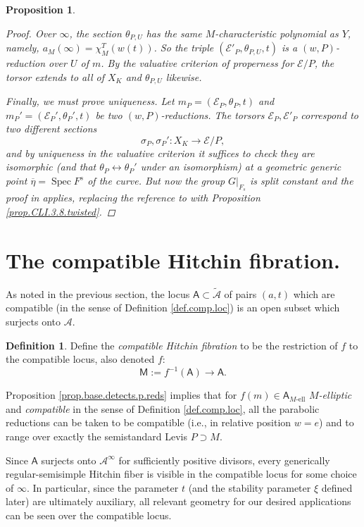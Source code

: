 \documentclass[openany]{amsbook}
\newtheorem{proposition}[theorem]{Proposition}
\theoremstyle{definition}
\newtheorem{definition}[theorem]{Definition}
\theoremstyle{remark}
\numberwithin{equation}{section}
\newcommand{\cA}{\mathcal{A}}
\newcommand{\cE}{\mathcal{E}}
\newcommand{\ol}[1]{\overline{#1}}
\renewcommand{\-}{\operatorname{-}}
\newcommand{\Spec}{\operatorname{Spec}}
\newcommand{\el}{\text{-ell}}
\newcommand{\ctA}{\widetilde{\cA}}
\newcommand{\bM}{\mathsf{M}}
\newcommand{\bA}{\mathsf{A}}
\newcommand{\bAe}[1]{\bA_{#1\el}}
\begin{document}
\begin{proposition}
\begin{proof}
        Over $\infty$, the section $\theta_{P,U}$ has the same $M$-characteristic polynomial as $Y$, namely, $a_M(\infty) = \chi_M^T(w(t))$. So the triple $(\cE'_P, \theta_{P,U}, t)$ is a $(w,P)$-reduction over $U$ of $m$. By the valuative criterion of properness for $\cE/P$, the torsor extends to all of $X_K$ and $\theta_{P,U}$ likewise.
        
        Finally, we must prove uniqueness. Let $m_P = (\cE_P, \theta_P, t)$ and $m_P' = (\cE_P', \theta_P', t)$ be two $(w,P)$-reductions. The torsors $\cE_P, \cE'_P$ correspond to two different sections \[
            \sigma_P, \sigma_P' : X_K \to \cE/P,
        \] and
        by uniqueness in the valuative criterion it suffices to check they are isomorphic (and that $\theta_P \leftrightarrow \theta_P'$ under an isomorphism) at a geometric generic point $\ol{\eta} = \Spec F^s$ of the curve. But now the group $G|_{F_s}$ is split constant and the proof in \cite[Proposition 4.10.1]{CLI} applies, replacing the reference to \cite[Proposition 3.9.1]{CLI} with Proposition \ref{prop.CLI.3.8.twisted}.
        \end{proof}
\end{proposition}

\section{The compatible Hitchin fibration.}

As noted in the previous section, the locus $\bA \subset \ctA$ of pairs $(a,t)$ which are compatible (in the sense of Definition \ref{def.comp.loc}) is an open subset which surjects onto $\cA$.

\begin{definition}
    Define the \emph{compatible Hitchin fibration} to be the restriction of $f$ to the compatible locus, also denoted $f$:
    $$
        \bM := f^{-1}(\bA) \to \bA.
    $$
\end{definition}
Proposition \ref{prop.base.detects.p.reds} implies that for $f(m) \in \bAe{M}$ \emph{$M$-elliptic} and \emph{compatible} in the sense of Definition \ref{def.comp.loc}, all the parabolic reductions can be taken to be compatible (i.e., in relative position $w = e$) and to range over exactly the semistandard Levis $P \supset M$. 

Since $\bA$ surjects onto $\cA^\infty$ for sufficiently positive divisors, every generically regular-semisimple Hitchin fiber is visible in the compatible locus for some choice of $\infty$. In particular, since the parameter $t$ (and the stability parameter $\xi$ defined later) are ultimately auxiliary, all relevant geometry for our desired applications can be seen over the compatible locus. 
\end{document}
